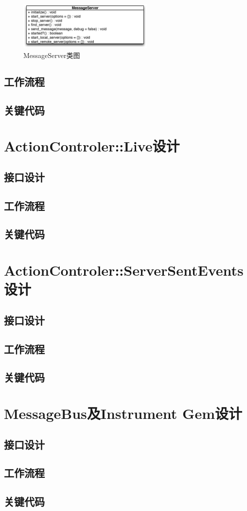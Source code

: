 \begin{figure}[h]
\centering
\includegraphics[width=0.6\textwidth]{images/detail/message_bus_class.eps}
\caption{MessageServer类图}
\label{fig-msg-server-class}
\end{figure}



\subsection{工作流程}
\subsection{关键代码}
\section{ActionControler::Live设计}
\subsection{接口设计}
\subsection{工作流程}
\subsection{关键代码}
\section{ActionControler::ServerSentEvents设计}
\subsection{接口设计}
\subsection{工作流程}
\subsection{关键代码}
\section{MessageBus及Instrument Gem设计}
\subsection{接口设计}
\subsection{工作流程}
\subsection{关键代码}










